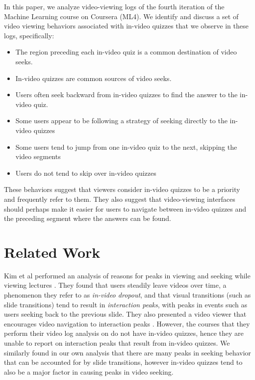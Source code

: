 \documentclass{sigchi}
\begin{document}
In this paper, we analyze video-viewing logs of the fourth iteration of the Machine Learning course on Coursera (ML4). We identify and discuss a set of video viewing behaviors associated with in-video quizzes that we observe in these logs, specifically:

\begin{itemize}
\item The region preceding each in-video quiz is a common destination of video seeks.
\item In-video quizzes are common sources of video seeks.
\item Users often seek backward from in-video quizzes to find the answer to the in-video quiz.
\item Some users appear to be following a strategy of seeking directly to the in-video quizzes
\item Some users tend to jump from one in-video quiz to the next, skipping the video segments
\item Users do not tend to skip over in-video quizzes
\end{itemize}

These behaviors suggest that viewers consider in-video quizzes to be a priority and frequently refer to them. They also suggest that video-viewing interfaces should perhaps make it easier for users to navigate between in-video quizzes and the preceding segment where the answers can be found.

\newpage

\section{Related Work}

Kim et al performed an analysis of reasons for peaks in viewing and seeking while viewing lectures \cite{juho}. They found that users steadily leave videos over time, a phenomenon they refer to as \emph{in-video dropout}, and that visual transitions (such as slide transitions) tend to result in \emph{interaction peaks}, with peaks in events such as users seeking back to the previous slide. They also presented a video viewer that encourages video navigation to interaction peaks  \cite{juho2}. However, the courses that they perform their video log analysis on do not have in-video quizzes, hence they are unable to report on interaction peaks that result from in-video quizzes. We similarly found in our own analysis that there are many peaks in seeking behavior that can be accounted for by slide transitions, however in-video quizzes tend to also be a major factor in causing peaks in video seeking.
\end{document}
